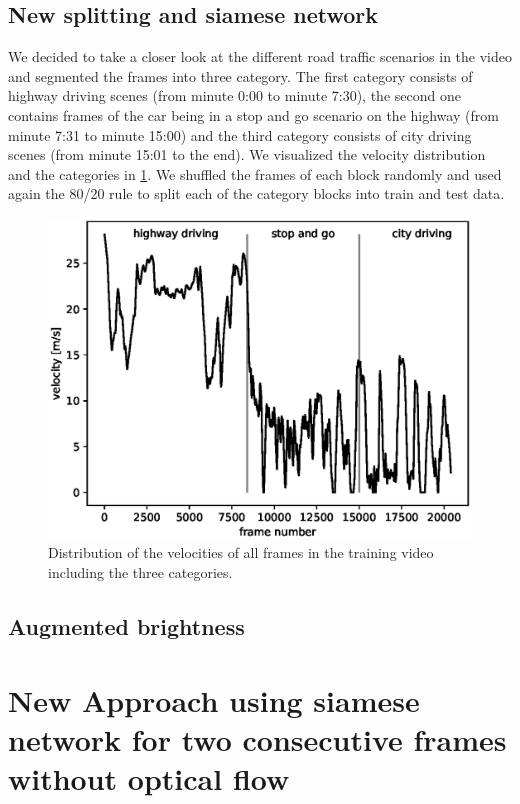 \documentclass[conference]{IEEEtran}
\begin{document}
\subsection{New splitting and siamese network}
We decided to take a closer look at the different road traffic scenarios in the video and segmented the 
frames into three category. The first category
consists of highway driving scenes (from minute 0:00 to minute 7:30), the second one contains frames of 
the car being
in a stop and go scenario on the highway (from minute 7:31 to minute 15:00) and the third category 
consists of
city driving scenes (from minute 15:01 to the end). We visualized the velocity distribution and the 
categories in 
\cref{fig:SpeedPerFrameDistributionNewSplitting}. 
We shuffled the frames of each block randomly and used again the 80/20 rule to split each of the 
category blocks into train and test data.
\begin{figure}[h]
\centering
\includegraphics[scale=0.6]{./imgs/plot_speed_time_new_splitting.eps}
\caption{Distribution of the velocities of all frames in the training video including the three categories.}
\label{fig:SpeedPerFrameDistributionNewSplitting}
\end{figure}
\subsection{Augmented brightness}

\section{New Approach using siamese network for two consecutive frames without optical flow}
\end{document}
